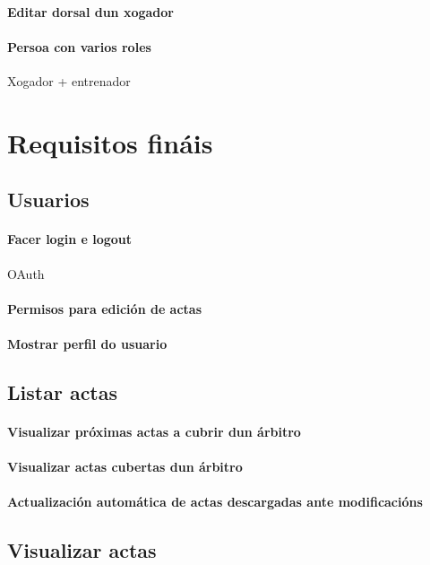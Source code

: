   \paragraph{Editar dorsal dun xogador}
  \paragraph{Persoa con varios roles} Xogador + entrenador
  
  \clearpage

  \section{Requisitos fináis}

  
  \subsection{Usuarios}
    \paragraph{Facer login e logout} OAuth
    \paragraph{Permisos para edición de actas}
    \paragraph{Mostrar perfil do usuario}

  \subsection{Listar actas}
    \paragraph{Visualizar próximas actas a cubrir dun árbitro}
    \paragraph{Visualizar actas cubertas dun árbitro}
    \paragraph{Actualización automática de actas descargadas ante modificacións}

  \subsection{Visualizar actas}
